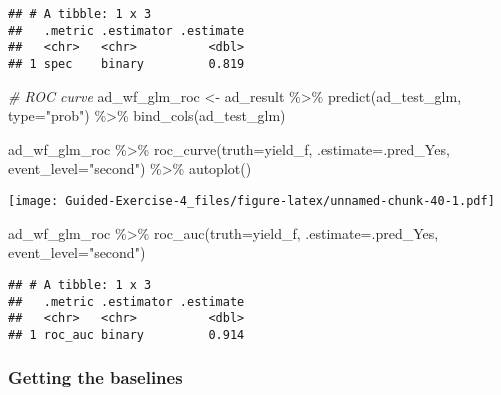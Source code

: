 \documentclass[
]{article}
\newenvironment{Shaded}{\begin{snugshade}}{\end{snugshade}}
\newcommand{\AttributeTok}[1]{\textcolor[rgb]{0.77,0.63,0.00}{#1}}
\newcommand{\CommentTok}[1]{\textcolor[rgb]{0.56,0.35,0.01}{\textit{#1}}}
\newcommand{\FunctionTok}[1]{\textcolor[rgb]{0.00,0.00,0.00}{#1}}
\newcommand{\NormalTok}[1]{#1}
\newcommand{\OtherTok}[1]{\textcolor[rgb]{0.56,0.35,0.01}{#1}}
\newcommand{\SpecialCharTok}[1]{\textcolor[rgb]{0.00,0.00,0.00}{#1}}
\newcommand{\StringTok}[1]{\textcolor[rgb]{0.31,0.60,0.02}{#1}}
\begin{document}
\begin{verbatim}
## # A tibble: 1 x 3
##   .metric .estimator .estimate
##   <chr>   <chr>          <dbl>
## 1 spec    binary         0.819
\end{verbatim}

\begin{Shaded}
\begin{Highlighting}[]
\CommentTok{\# ROC curve}
\NormalTok{ad\_wf\_glm\_roc }\OtherTok{\textless{}{-}}\NormalTok{ ad\_result }\SpecialCharTok{\%\textgreater{}\%}
  \FunctionTok{predict}\NormalTok{(ad\_test\_glm, }\AttributeTok{type=}\StringTok{"prob"}\NormalTok{) }\SpecialCharTok{\%\textgreater{}\%}
  \FunctionTok{bind\_cols}\NormalTok{(ad\_test\_glm)}
\end{Highlighting}
\end{Shaded}

\begin{Shaded}
\begin{Highlighting}[]
\NormalTok{ad\_wf\_glm\_roc }\SpecialCharTok{\%\textgreater{}\%}
  \FunctionTok{roc\_curve}\NormalTok{(}\AttributeTok{truth=}\NormalTok{yield\_f, }\AttributeTok{.estimate=}\NormalTok{.pred\_Yes, }\AttributeTok{event\_level=}\StringTok{"second"}\NormalTok{) }\SpecialCharTok{\%\textgreater{}\%}
  \FunctionTok{autoplot}\NormalTok{()}
\end{Highlighting}
\end{Shaded}

\texttt{[image: Guided-Exercise-4\_files/figure-latex/unnamed-chunk-40-1.pdf]}

\begin{Shaded}
\begin{Highlighting}[]
\NormalTok{ad\_wf\_glm\_roc }\SpecialCharTok{\%\textgreater{}\%}
  \FunctionTok{roc\_auc}\NormalTok{(}\AttributeTok{truth=}\NormalTok{yield\_f, }\AttributeTok{.estimate=}\NormalTok{.pred\_Yes, }\AttributeTok{event\_level=}\StringTok{"second"}\NormalTok{)}
\end{Highlighting}
\end{Shaded}

\begin{verbatim}
## # A tibble: 1 x 3
##   .metric .estimator .estimate
##   <chr>   <chr>          <dbl>
## 1 roc_auc binary         0.914
\end{verbatim}

\hypertarget{getting-the-baselines}{%
\subsubsection{Getting the baselines}\label{getting-the-baselines}}
\end{document}

